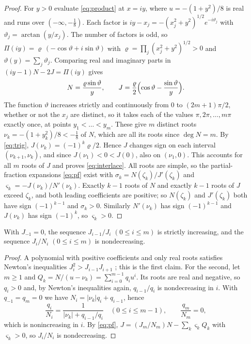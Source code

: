 \begin{proof}
For \(y>0\) evaluate \eqref{eq:product} at \(x=iy\), where \(u=-(1+y^2)/8\) is real and runs
over \((-\infty,-\tfrac18)\). Each factor is
\(iy-x_j=-(x_j^2+y^2)^{1/2}e^{-i\vartheta_j}\) with \(\vartheta_j=\arctan(y/x_j)\). The number
of factors is odd, so \(\Pi(iy)=\varrho\,(-\cos\vartheta+i\sin\vartheta)\) with
\(\varrho=\prod_j(x_j^2+y^2)^{1/2}>0\) and \(\vartheta(y)=\sum_j\vartheta_j\). Comparing real and
imaginary parts in \((iy-1)N-2J=\Pi(iy)\) gives
\begin{equation}\label{eq:trig}
 N=\frac{\varrho\sin\vartheta}{y},\qquad
 J=\frac{\varrho}{2}\Bigl(\cos\vartheta-\frac{\sin\vartheta}{y}\Bigr).
\end{equation}
The function \(\vartheta\) increases strictly and continuously from \(0\) to \((2m+1)\pi/2\),
whether or not the \(x_j\) are distinct, so it takes each of the values \(\pi,2\pi,\dots,m\pi\)
exactly once, at points \(y_1<\dots<y_m\). These give \(m\) distinct roots
\(\nu_k=-(1+y_k^2)/8<-\tfrac18\) of \(N\), which are all its roots since \(\deg N=m\). By
\eqref{eq:trig}, \(J(\nu_k)=(-1)^k\varrho/2\). Hence \(J\) changes sign on each interval
\((\nu_{k+1},\nu_k)\), and since \(J(\nu_1)<0<J(0)\), also on \((\nu_1,0)\). This accounts for
all \(m\) roots of \(J\) and proves \eqref{eq:interlace}. All roots are simple, so the
partial-fraction expansions \eqref{eq:pf} exist with \(\sigma_k=N(\zeta_k)/J'(\zeta_k)\) and
\(\varsigma_k=-J(\nu_k)/N'(\nu_k)\). Exactly \(k-1\) roots of \(N\) and exactly \(k-1\) roots of \(J\)
exceed \(\zeta_k\), and both leading coefficients are positive; so \(N(\zeta_k)\) and
\(J'(\zeta_k)\) both have sign \((-1)^{k-1}\) and \(\sigma_k>0\). Similarly \(N'(\nu_k)\) has
sign \((-1)^{k-1}\) and \(J(\nu_k)\) has sign \((-1)^k\), so \(\varsigma_k>0\).
\end{proof}

\begin{lemma}\label{lem:ratios}
With \(J_{-1}=0\), the sequence \(J_{i-1}/J_i\) \((0\le i\le m)\) is strictly increasing, and
the sequence \(J_i/N_i\) \((0\le i\le m)\) is nondecreasing.
\end{lemma}
\begin{proof}
A polynomial with positive coefficients and only real roots satisfies Newton's inequalities
\(J_i^2>J_{i-1}J_{i+1}\) \cite[\S2.22]{HLP}; this is the first claim. For the second, let
\(m\ge1\) and \(Q_k=N/(u-\nu_k)=\sum_{i=0}^{m-1}q_iu^i\). Its roots are real and negative, so
\(q_i>0\) and, by Newton's inequalities again, \(q_{i-1}/q_i\) is nondecreasing in \(i\). With
\(q_{-1}=q_m=0\) we have \(N_i=|\nu_k|q_i+q_{i-1}\), hence
\[
 \frac{q_i}{N_i}=\frac{1}{|\nu_k|+q_{i-1}/q_i}\quad(0\le i\le m-1),\qquad \frac{q_m}{N_m}=0,
\]
which is nonincreasing in \(i\). By \eqref{eq:pf},
\(J=(J_m/N_m)N-\sum_k\varsigma_kQ_k\) with \(\varsigma_k>0\), so \(J_i/N_i\) is nondecreasing.
\end{proof}

